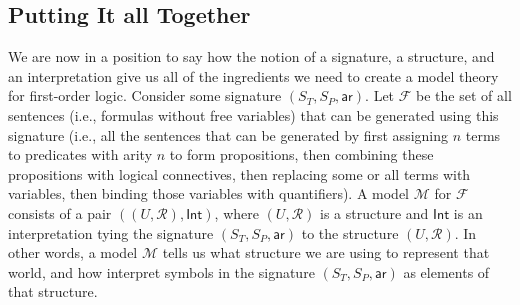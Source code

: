 \documentclass[11pt]{article}
\theoremstyle{definition}
\theoremstyle{remark}
\begin{document}
\subsection{Putting It all Together}
We are now in a position to say how the notion of a signature, a structure, and an interpretation give us all of the ingredients we need to create a model theory for first-order logic. Consider some signature $(S_{T},S_{P},\textsf{ar})$. Let $\mathcal{F}$ be the set of all sentences (i.e., formulas without free variables) that can be generated using this signature (i.e., all the sentences that can be generated by first assigning $n$ terms to predicates with arity $n$ to form propositions, then combining these propositions with logical connectives, then replacing some or all terms with variables, then binding those variables with quantifiers). A model $\mathcal{M}$ for $\mathcal{F}$ consists of a pair $((U,\mathcal{R}),\textsf{Int})$, where $(U,\mathcal{R})$ is a structure and $\textsf{Int}$ is an interpretation tying the signature $(S_{T},S_{P},\textsf{ar})$ to the structure $(U,\mathcal{R})$. In other words, a model $\mathcal{M}$ tells us what structure we are using to represent that world, and how interpret symbols in the signature $(S_{T},S_{P},\textsf{ar})$ as elements of that structure.\par
\end{document}
